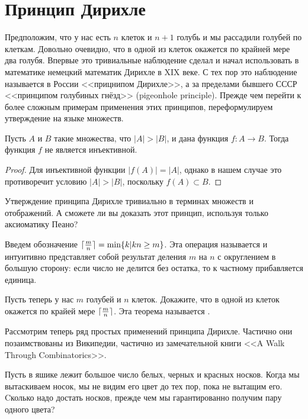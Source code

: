 \section{Принцип Дирихле}

Предположим, что у нас есть $n$ клеток и $n+1$ голубь и мы рассадили голубей по клеткам. Довольно очевидно, что в одной из клеток окажется по крайней мере два голубя. Впервые это тривиальные наблюдение сделал и начал использовать в математике немецкий математик Дирихле в XIX веке. С тех пор это наблюдение называется в России <<прицнипом Дирихле>>, а за пределами бывшего СССР <<принципом голубиных гнёзд>> (pigeonhole principle). Прежде чем перейти к более сложным примерам применения этих принципов, переформулируем утверждение на языке множеств.

\begin{thm}
Пусть $A$ и $B$ такие множества, что $|A|>|B|$, и дана функция $f:A\to B$. Тогда функция $f$ не является инъективной.
\end{thm}
\begin{proof}
Для инъективной функции $|f(A)| = |A|$, однако в нашем случае это противоречит условию $|A|>|B|$, поскольку $f(A)\subset B$.
\end{proof}

\begin{exercise}
Утверждение принципа Дирихле тривиально в терминах множеств и отображений. А сможете ли вы доказать этот принцип, используя только аксиоматику Пеано?
\end{exercise}

Введем обозначение $\lceil {m\over n} \rceil = \min\{k|kn\ge m\}$. Эта операция называется  и интуитивно представляет собой результат деления $m$ на $n$ с округлением в большую сторону: если число не делится без остатка, то к частному прибавляется единица.

\begin{exercise}
Пусть теперь у нас $m$ голубей и $n$ клеток. Докажите, что в одной из клеток окажется по крайей мере $\lceil{m\over n}\rceil$. Эта теорема называется .
\end{exercise}

Рассмотрим теперь ряд простых применений принципа Дирихле. Частично они позаимствованы из Википедии, частично из замечательной книги <<A Walk Through Combinatorics>>.

\begin{example}
Пусть в яшике лежит большое число белых, черных и красных носков. Когда мы вытаскиваем носок, мы не видим его цвет до тех пор, пока не вытащим его. Cколько надо достать носков, прежде чем мы гарантированно получим пару одного цвета?
\end{example}

